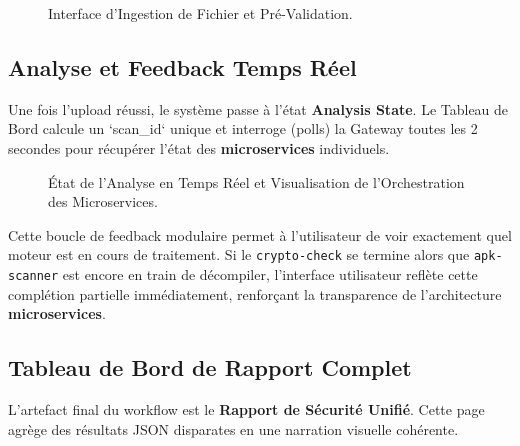\documentclass[
  journal=largetwo,
  manuscript=article-type,
  year=2025,
  volume=1,
]{cup-journal}
\begin{document}
\begin{figure}
\centering
{}
\caption{Interface d'Ingestion de Fichier et Pré-Validation.}
\label{fig:upload}
\end{figure}

\subsection{Analyse et Feedback Temps Réel}
Une fois l'upload réussi, le système passe à l'état \textbf{Analysis State}. Le Tableau de Bord calcule un `scan\_id` unique et interroge (polls) la Gateway toutes les 2 secondes pour récupérer l'état des \textbf{microservices} individuels.

\begin{figure}
\centering
{}
\caption{État de l'Analyse en Temps Réel et Visualisation de l'Orchestration des Microservices.}
\label{fig:loading}
\end{figure}

Cette boucle de feedback modulaire permet à l'utilisateur de voir exactement quel moteur est en cours de traitement. Si le \texttt{crypto-check} se termine alors que \texttt{apk-scanner} est encore en train de décompiler, l'interface utilisateur reflète cette complétion partielle immédiatement, renforçant la transparence de l'architecture \textbf{microservices}.

\subsection{Tableau de Bord de Rapport Complet}
L'artefact final du workflow est le \textbf{Rapport de Sécurité Unifié}. Cette page agrège des résultats JSON disparates en une narration visuelle cohérente.
\end{document}
